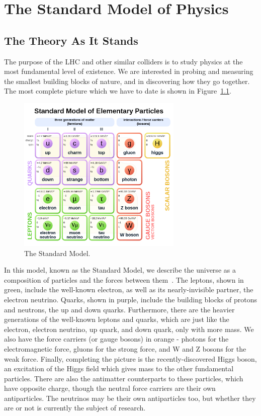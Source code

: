 \chapter{The Standard Model of Physics}\label{chap:SM}

\section{The Theory As It Stands}

The purpose of the LHC and other similar colliders is to study physics at the most fundamental level of existence. We are interested in probing and measuring the smallest building blocks of nature, and in discovering how they go together. The most complete picture which we have to date is shown in Figure~\ref{fig:standard_model}.

\begin{figure}[htbp]
    \centering
    \includegraphics[width=0.7\textwidth]{Images/Background/standard_model.png}
    \caption{The Standard Model.}
    \label{fig:standard_model}
\end{figure}

In this model, known as the Standard Model, we describe the universe as a composition of particles and the forces between them~\cite{Griffiths}. The leptons, shown in green, include the well-known electron, as well as its nearly-invisible partner, the electron neutrino. Quarks, shown in purple, include the building blocks of protons and neutrons, the up and down quarks. Furthermore, there are the heavier generations of the well-known leptons and quarks, which are just like the electron, electron neutrino, up quark, and down quark, only with more mass. We also have the force carriers (or gauge bosons) in orange - photons for the electromagnetic force, gluons for the strong force, and W and Z bosons for the weak force. Finally, completing the picture is the recently-discovered Higgs boson, an excitation of the Higgs field which gives mass to the other fundamental particles. There are also the antimatter counterparts to these particles, which have opposite charge, though the neutral force carriers are their own antiparticles. The neutrinos may be their own antiparticles too, but whether they are or not is currently the subject of research.

